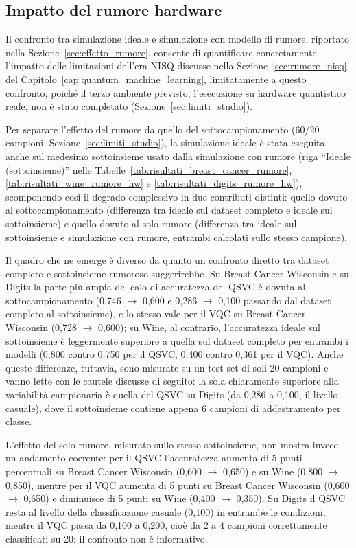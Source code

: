 \subsection{Impatto del rumore hardware}
Il confronto tra simulazione ideale e simulazione con modello di rumore, riportato nella Sezione~\ref{sec:effetto_rumore}, consente di quantificare concretamente l'impatto delle limitazioni dell'era NISQ discusse nella Sezione~\ref{sec:rumore_nisq} del Capitolo~\ref{cap:quantum_machine_learning}, limitatamente a questo confronto, poiché il terzo ambiente previsto, l'esecuzione su hardware quantistico reale, non è stato completato (Sezione~\ref{sec:limiti_studio}).

Per separare l'effetto del rumore da quello del sottocampionamento (60/20 campioni, Sezione~\ref{sec:limiti_studio}), la simulazione ideale è stata eseguita anche sul medesimo sottoinsieme usato dalla simulazione con rumore (riga ``Ideale (sottoinsieme)'' nelle Tabelle~\ref{tab:risultati_breast_cancer_rumore}, \ref{tab:risultati_wine_rumore_hw} e \ref{tab:risultati_digits_rumore_hw}), scomponendo così il degrado complessivo in due contributi distinti: quello dovuto al sottocampionamento (differenza tra ideale sul dataset completo e ideale sul sottoinsieme) e quello dovuto al solo rumore (differenza tra ideale sul sottoinsieme e simulazione con rumore, entrambi calcolati sullo stesso campione).

Il quadro che ne emerge è diverso da quanto un confronto diretto tra dataset completo e sottoinsieme rumoroso suggerirebbe. Su Breast Cancer Wisconsin e su Digits la parte più ampia del calo di accuratezza del QSVC è dovuta al sottocampionamento (0,746 $\to$ 0,600 e 0,286 $\to$ 0,100 passando dal dataset completo al sottoinsieme), e lo stesso vale per il VQC su Breast Cancer Wisconsin (0,728 $\to$ 0,600); su Wine, al contrario, l'accuratezza ideale sul sottoinsieme è leggermente superiore a quella sul dataset completo per entrambi i modelli (0,800 contro 0,750 per il QSVC, 0,400 contro 0,361 per il VQC). Anche queste differenze, tuttavia, sono misurate su un test set di soli 20 campioni e vanno lette con le cautele discusse di seguito: la sola chiaramente superiore alla variabilità campionaria è quella del QSVC su Digits (da 0,286 a 0,100, il livello casuale), dove il sottoinsieme contiene appena 6 campioni di addestramento per classe.

L'effetto del solo rumore, misurato sullo stesso sottoinsieme, non mostra invece un andamento coerente: per il QSVC l'accuratezza aumenta di 5 punti percentuali su Breast Cancer Wisconsin (0,600 $\to$ 0,650) e su Wine (0,800 $\to$ 0,850), mentre per il VQC aumenta di 5 punti su Breast Cancer Wisconsin (0,600 $\to$ 0,650) e diminuisce di 5 punti su Wine (0,400 $\to$ 0,350). Su Digits il QSVC resta al livello della classificazione casuale (0,100) in entrambe le condizioni, mentre il VQC passa da 0,100 a 0,200, cioè da 2 a 4 campioni correttamente classificati su 20: il confronto non è informativo.

